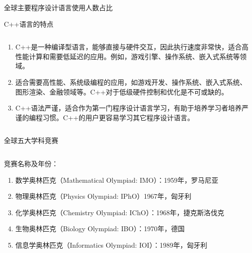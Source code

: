 \documentclass{beamer}
\begin{document}
\begin{frame}{全球主要程序设计语言使用人数占比}
\end{frame}

\begin{frame}[t]{C++语言的特点}
\begin{columns}
\begin{spacing}{1.2}
\large
    \begin{enumerate}[label={\arabic*.}]
    \item C++是一种编译型语言，能够直接与硬件交互，因此执行速度非常快，适合高性能计算和需要低延迟的应用。例如，游戏引擎、操作系统、嵌入式系统等领域。
	\item 适合需要高性能、系统级编程的应用，如游戏开发、操作系统、嵌入式系统、图形渲染、金融领域等。C++对于低级硬件控制和优化是不可或缺的。\\
	\item C++语法严谨，适合作为第一门程序设计语言学习，有助于培养学习者培养严谨的编程习惯。C++的用户更容易学习其它程序设计语言。
    \end{enumerate}
\end{spacing}
\end{columns}
\end{frame}

\begin{frame}{全球五大学科竞赛}

\begin{columns}
\begin{spacing}{1.2}
\large
竞赛名称及年份：\\
\begin{enumerate}[label={\arabic*.}]
    \item 数学奥林匹克（Mathematical Olympiad: IMO）：1959年，罗马尼亚
    \item 物理奥林匹克（Physics Olympiad: IPhO）1967年，匈牙利
    \item 化学奥林匹克（Chemistry Olympiad: IChO）：1968年，捷克斯洛伐克
    \item 生物奥林匹克（Biology Olympiad: IBO）：1970年，德国
    \item 信息学奥林匹克（Informatics Olympiad: IOI）：1989年，匈牙利
\end{enumerate}
\end{spacing}
\end{columns}
\end{frame}
\end{document}
